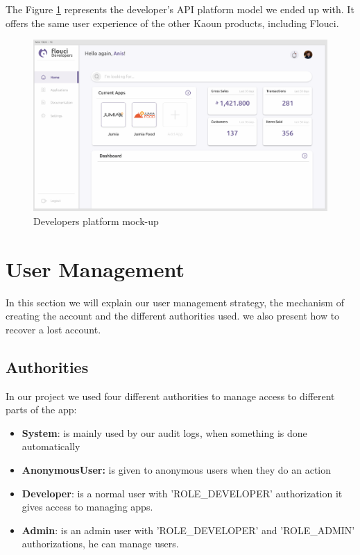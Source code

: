 \begin{spacing}{1.2}
The Figure \ref{developersPlatform} represents the developer's API platform model we ended up with. It offers the same user experience of the other Kaoun products, including Flouci.

\begin{figure}[H]\centering
\includegraphics[scale=0.4]{web_screen}
\caption{Developers platform mock-up}
\label{developersPlatform}
\end{figure}

\section{User Management}
In this section we will explain our user management strategy, the mechanism of creating the account and the different authorities used. we also present how to recover a lost account.
\subsection{Authorities}
In our project we used four different authorities to manage access to different parts of the app:
\begin{itemize}
	\item \textbf{System}:  is mainly used by our audit logs, when something is done automatically
	\item \textbf{AnonymousUser:}  is given to anonymous users when they do an action
	\item \textbf{Developer}:  is a normal user with 'ROLE\_DEVELOPER' authorization it gives access to managing apps.
	\item  \textbf{Admin}:  is an admin user with 'ROLE\_DEVELOPER' and 'ROLE\_ADMIN' authorizations, he can manage users.
\end{itemize}


\end{spacing}
